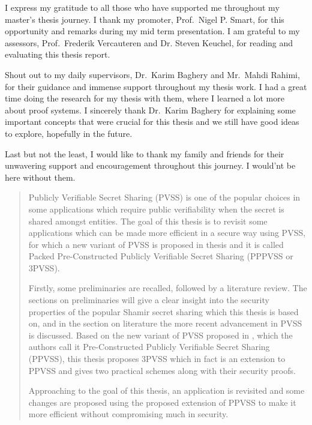\documentclass[master=mcs]{kulemt}
\begin{document}
\begin{preface}
  I express my gratitude to all those who have supported me throughout my master's thesis 
  journey. I thank my promoter, Prof.\ Nigel P. Smart, for this opportunity and remarks 
  during my mid term presentation. I am grateful to my assessors, Prof.\ Frederik Vercauteren and 
  Dr. Steven Keuchel, for reading and evaluating this thesis report.\par

  Shout out to my daily supervisors, Dr.\ Karim Baghery and Mr.\ Mahdi Rahimi, for their 
  guidance and immense support throughout my thesis work. I had a great time doing the research 
  for my thesis with them, where I learned a lot more about proof systems. I sincerely 
  thank Dr.\ Karim Baghery for explaining some important concepts that were crucial 
  for this thesis and we still have good ideas to explore, hopefully in the future.\par

  Last but not the least, I would like to thank my family and friends for their
  unwavering support and encouragement throughout this journey. I would'nt be here without them.
\end{preface}

\tableofcontents*

\begin{abstract}
  Publicly Verifiable Secret Sharing (PVSS) is one of the popular choices in some applications 
  which require public verifiability when the secret is shared amongst entities. The goal 
  of this thesis is to revisit some applications which can be made more efficient in a 
  secure way using PVSS, for which a new variant of PVSS is proposed in thesis and it is 
  called Packed Pre-Constructed Publicly Verifiable Secret Sharing (PPPVSS or 3PVSS).\par
  
  Firstly, some preliminaries are recalled, followed by a literature review. The 
  sections on preliminaries will give a clear insight into the security properties of 
  the popular Shamir secret sharing which this thesis is based on, and in the section 
  on literature the more recent advancement in PVSS is discussed. Based on 
  the new variant of PVSS proposed in \cite{cryptoeprint:2025/576}, which the authors 
  call it Pre-Constructed Publicly Verifiable Secret Sharing (PPVSS), this thesis 
  proposes 3PVSS which in fact is an extension to PPVSS and gives two practical 
  schemes along with their security proofs.\par

  Approaching to the goal of this thesis, an application is revisited and some changes are proposed 
  using the proposed extension of PPVSS to make it more efficient without 
  compromising much in security.\par
\end{abstract}
\end{document}

